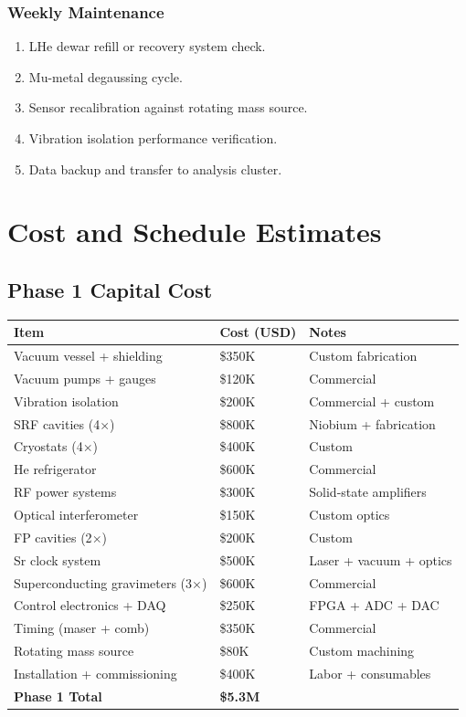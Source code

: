 \documentclass[11pt,a4paper]{article}
\begin{document}
\subsubsection{Weekly Maintenance}

\begin{enumerate}[nosep]
\item LHe dewar refill or recovery system check.
\item Mu-metal degaussing cycle.
\item Sensor recalibration against rotating mass source.
\item Vibration isolation performance verification.
\item Data backup and transfer to analysis cluster.
\end{enumerate}

\section{Cost and Schedule Estimates}

\subsection{Phase 1 Capital Cost}

\begin{longtable}{p{}p{}p{}}
\toprule
\textbf{Item} & \textbf{Cost (USD)} & \textbf{Notes} \\
\midrule
\endhead
Vacuum vessel + shielding & \$350K & Custom fabrication \\
Vacuum pumps + gauges & \$120K & Commercial \\
Vibration isolation & \$200K & Commercial + custom \\
SRF cavities (4$\times$) & \$800K & Niobium + fabrication \\
Cryostats (4$\times$) & \$400K & Custom \\
He refrigerator & \$600K & Commercial \\
RF power systems & \$300K & Solid-state amplifiers \\
Optical interferometer & \$150K & Custom optics \\
FP cavities (2$\times$) & \$200K & Custom \\
Sr clock system & \$500K & Laser + vacuum + optics \\
Superconducting gravimeters (3$\times$) & \$600K & Commercial \\
Control electronics + DAQ & \$250K & FPGA + ADC + DAC \\
Timing (maser + comb) & \$350K & Commercial \\
Rotating mass source & \$80K & Custom machining \\
Installation + commissioning & \$400K & Labor + consumables \\
\midrule
\textbf{Phase 1 Total} & \textbf{\$5.3M} & \\
\bottomrule
\end{longtable}
\end{document}

